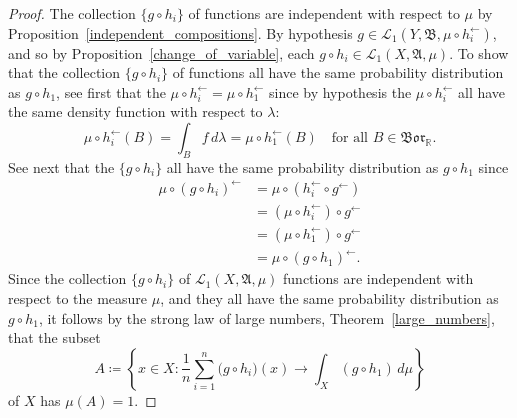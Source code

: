 \documentclass[
twoside=true,
paper=letter,
fontsize=9pt,
pagesize=auto,
leqno,
openany,
headsepline,
overfullrule,
]{scrbook}
\theoremstyle{plain}
\theoremstyle{plain}
\theoremstyle{definition}
\theoremstyle{bfnoteitalic}
\theoremstyle{bfnoteroman}
\newcommand{\sigalg}[1]{\mathfrak{#1}}
\newcommand{\cali}[1]{\mathscr{#1}}
\newcommand{\definedby}{\coloneqq}
\newcommand{\borel}{\mathfrak{Bor}}
\newcommand{\preimage}[1]{#1^{\leftarrow}}
\newcommand{\R}{\mathbb{R}}
\newcommand{\sigmaalgebra}{\sigalg{A}}
\newcommand{\sigmaalgebraii}{\sigalg{B}}
\newcommand{\funcg}{g}
\newcommand{\funch}{h}
\newcommand{\function}{f}
\newcommand{\functionii}{g}
\newcommand{\functioniii}{h}
\newcommand{\measurespace}{X}
\newcommand{\measurespaceii}{Y}
\newcommand{\mspaceelt}{x}
\newcommand{\measure}{\mu}
\newcommand{\measmu}{\mu}
\newcommand{\measureiii}{\lambda}
\newcommand{\seti}{A}
\newcommand{\setii}{B}
\begin{document}
\begin{proof}
The collection 
$\{
\funcg\circ\funch_i
\}$
of functions are independent with respect to $\measmu$
by Proposition~\ref{independent_compositions}.
By hypothesis
$\funcg\in
\cali{L}_1(\measurespaceii,\sigmaalgebraii,\measmu\circ\preimage{\funch_i})$,
and so by Proposition~\ref{change_of_variable}, each
$\funcg\circ\funch_i
\in
\cali{L}_1(\measurespace, \sigmaalgebra, \measmu)$.
To show that the collection 
$\{
\functionii\circ\functioniii_i
\}$
of functions all have the same probability distribution as $\functionii\circ\functioniii_1$, 
see first that the 
$\measure\circ \preimage{\functioniii_i} = \measure\circ\preimage{\functioniii_1}$ since by hypothesis the 
$\measure\circ \preimage{\functioniii_i}$ all have the same density function with respect to 
$\measureiii$:
\[
\measure\circ \preimage{\functioniii_i} (\setii) 
=
\int_\setii \function\, d\measureiii
=
\measure\circ \preimage{\functioniii_1} (\setii) 
\quad\text{for all $\setii\in\borel_\R$.}
\]
See next that the $\{
\functionii\circ\functioniii_i
\}$
all have the same probability distribution as $\funcg\circ\funch_1$ since
\begin{align*}
\measure\circ \preimage{(\functionii \circ\functioniii_i)}
& = \measure\circ(\preimage{\functioniii_i}\circ\preimage{\functionii}) \\
& = (\measure\circ\preimage{\functioniii_i})\circ\preimage{\functionii} \\
& = (\measure\circ\preimage{\functioniii_1})\circ\preimage{\functionii} \\
& = \measure\circ \preimage{(\functionii \circ\functioniii_1)}.
\end{align*}
Since the collection 
$\{
\functionii\circ\functioniii_i
\}$
of
$\cali{L}_1(\measurespace, \sigmaalgebra, \measure)$
functions are independent with respect to the measure $\measure$, and they all have the same probability distribution as
$\functionii\circ\functioniii_1$, it follows by the strong law of large numbers, Theorem~\ref{large_numbers}, that the subset 
\[
\seti\definedby
\left\{ 
\mspaceelt\in\measurespace : 
\frac{1}{n} \sum_{i=1}^n \bigl( \functionii\circ \functioniii_i \bigr) (x) \to
\int_\measurespace (\functionii \circ \functioniii_1) \,d\measure 
\right\}
\]
of $\measurespace$ has $\measure(\seti)=1$. 


\end{proof}
\end{document}
